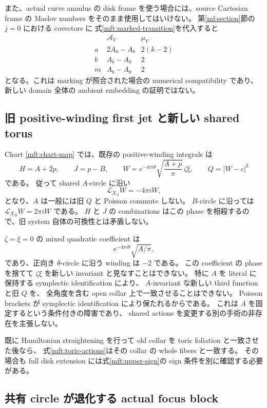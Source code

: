また、actual curve annulus の disk frame を使う場合には、source Cartesian frame の
Maslov numbers をそのまま使用してはいけない。
第\ref{ml:section}節の $j=0$ における covectors に
式\eqref{mft:marked-transition}を代入すると
\[
\begin{array}{c|c|c}
 &\mathcal A_V&\mu_V\\\hline
 a&2A_0-A_b&2(k-2)\\
 b&A_b-A_0&2\\
 m&A_b-A_0&2
\end{array}
\]
となる。これは marking が照合された場合の numerical compatibility であり、
新しい domain 全体の ambient embedding の証明ではない。

\subsection{旧 positive-winding first jet と新しい shared torus}

Chart \eqref{mft:chart-map} では、既存の positive-winding integrals は
\begin{equation}\label{mft:old-system}
 H=A+2p,\qquad J=p-B,\qquad
 W=e^{-4\pi i\theta}\sqrt{\frac{A+p}{\pi}}\,\zeta\xi,
 \qquad Q=|W-c|^2
\end{equation}
である。
従って shared $A$-circle に沿い
\[
 \mathcal L_{X_A}W=-4\pi iW,
\]
となり、$A$ は一般には旧 $Q$ と Poisson commute しない。
$B$-circle に沿っては $\mathcal L_{X_B}W=2\pi iW$ である。
$H$ と $J$ の combinations はこの phase を相殺するので、旧 system 自体の可換性とは矛盾しない。

$\zeta=\xi=0$ の mixed quadratic coefficient は
\[
 e^{-4\pi i\theta}\sqrt{A/\pi},
\]
であり、正向き $\theta$-circle に沿う winding は $-2$ である。
この coefficient の phase を捨てて $\zeta\xi$ を新しい invariant と見なすことはできない。
特に $A$ を literal に保持する symplectic identification により、
$A$-invariant な新しい third function と旧 $Q$ を、
全角度を含む open collar 上で一致させることはできない。
Poisson brackets が symplectic identification により保たれるからである。
これは $A$ を固定するという条件付きの障害であり、
shared actions を変更する別の手術の非存在を主張しない。

既に Hamiltonian straightening を行って old collar を toric foliation と一致させた後なら、
式\eqref{mft:toric-actions}はその collar の whole fibers と一致する。
その場合も full disk extension には式\eqref{mft:upper-sign}の sign 条件を別に確認する必要がある。

\subsection{共有 circle が退化する actual focus block}

